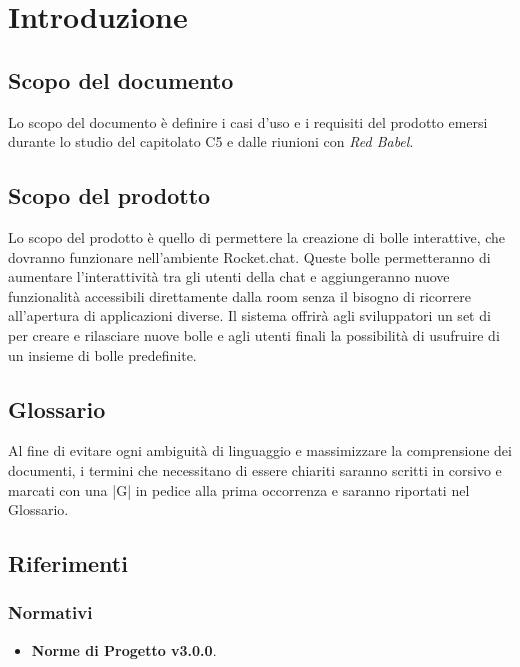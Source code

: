 \section{Introduzione}

\subsection{Scopo del documento}
Lo scopo del documento è definire i casi d'uso e i requisiti del prodotto emersi durante lo studio del capitolato C5 e dalle riunioni con \textit{Red Babel}.

\subsection{Scopo del prodotto}

Lo scopo del prodotto è quello di permettere la creazione di bolle
interattive, che dovranno funzionare nell’ambiente Rocket.chat. Queste
bolle permetteranno di aumentare l'interattività tra gli utenti della
chat e aggiungeranno nuove funzionalità accessibili
direttamente dalla room senza il bisogno di ricorrere
all'apertura di applicazioni diverse.
Il sistema offrirà agli sviluppatori un set di  per creare e
rilasciare nuove bolle e agli utenti finali la possibilità di
usufruire di un insieme di bolle predefinite.

\subsection{Glossario}

Al fine di evitare ogni ambiguità di linguaggio e massimizzare la
comprensione dei documenti, i termini che necessitano di essere
chiariti saranno scritti in corsivo e marcati con una |G| in pedice alla prima
occorrenza e saranno riportati nel Glossario.


\subsection{Riferimenti}

\subsubsection{Normativi}
\begin{itemize}
\item \textbf{Norme di Progetto v3.0.0}.
\end{itemize}

